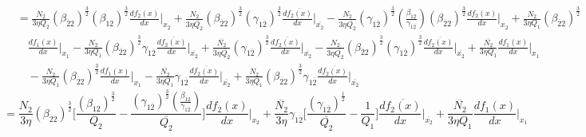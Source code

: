 \documentclass[fleqn, 10pt]{article}
\begin{document}
                \begin{equation*}
                \begin{split}
                    &=  \frac{N_2}{3 \eta Q_2} (\beta_{\overline{2}2})^\frac{3}{2} (\beta_{12})^\frac{3}{2} \frac{df_2(x)}{dx} \Bigg|_{x_2} +   \frac{N_2}{3 \eta \overline{Q_{2}}} (\beta_{\overline{2}2})^\frac{3}{2} (\gamma_{1\overline{2}})^\frac{3}{2} \frac{d\overline{f_{2}(x)}}{dx} \Bigg|_{\overline{x_{2}}} -   \frac{N_2}{3 \eta \overline{Q_{2}}} (\gamma_{1\overline{2}})^\frac{3}{2} \left( \frac{\beta_{12}}{\gamma_{1\overline{2}}}\right)(\beta_{\overline{2}2})^\frac{3}{2} \frac{df_2(x)}{dx} \Bigg|_{x_2} + \frac{N_2}{3 \eta Q_1}(\beta_{\overline{2}2})^\frac{3}{2} \\ & \quad   \frac{df_1(x)}{dx} \Bigg|_{x_1}  -   \frac{N_2}{3 \eta Q_1} (\beta_{\overline{2}2})^\frac{3}{2} \gamma_{1\overline{2}} \frac{d\overline{f_{2}(x)}}{dx} \Bigg|_{\overline{x_{2}}} +   \frac{\overline{N_{2}}}{3 \eta \overline{Q_{2}}} (\gamma_{1\overline{2}})^\frac{3}{2} \frac{d\overline{f_{2}(x)}}{dx} \Bigg|_{\overline{x_{2}}} -   \frac{N_2}{3 \eta \overline{Q_{2}}} (\beta_{\overline{2}2})^\frac{3}{2} (\gamma_{1\overline{2}})^\frac{3}{2} \frac{d\overline{f_{2}(x)}}{dx} \Bigg|_{\overline{x_{2}}} +   \frac{\overline{N_{2}}}{3 \eta Q_1} \frac{df_1(x)}{dx} \Bigg|_{x_1} \\ & \quad -   \frac{N_2}{3 \eta Q_1} (\beta_{\overline{2}2})^\frac{3}{2} \frac{df_1(x)}{dx} \Bigg|_{x_1} -   \frac{\overline{N_{2}}}{3 \eta Q_1} \gamma_{1\overline{2}} \frac{d\overline{f_{2}(x)}}{dx} \Bigg|_{\overline{x_{2}}} +   \frac{N_2}{3 \eta Q_1} (\beta_{\overline{2}2})^\frac{3}{2} \gamma_{1\overline{2}} \frac{d\overline{f_{2}(x)}}{dx} \Bigg|_{\overline{x_{2}}}
                    \end{split}
                \end{equation*}
                \begin{equation}
                    = \frac{N_2}{3 \eta} (\beta_{\overline{2}2})^\frac{3}{2} \Biggl[ \frac{(\beta_{12})^\frac{3}{2}}{Q_2} -   \frac{(\gamma_{1\overline{2}})^\frac{3}{2} \left( \frac{\beta_{12}}{\gamma_{1\overline{2}}}\right)}{\overline{Q_{2}}} \Biggr] \frac{df_2(x)}{dx} \Bigg|_{x_2} + \frac{\overline{N_{2}}}{3 \eta} \gamma_{1\overline{2}} \biggl[ \frac{(\gamma_{1\overline{2}})^\frac{1}{2}}{\overline{Q_{2}}} -   \frac{1}{Q_1} \biggr] \frac{d\overline{f_{2}(x)}}{dx} \Bigg|_{\overline{x_{2}}} +   \frac{\overline{N_{2}}}{3 \eta Q_1} \frac{df_1(x)}{dx} \Bigg|_{x_1}
                    \label{87}
                \end{equation}
\end{document}

